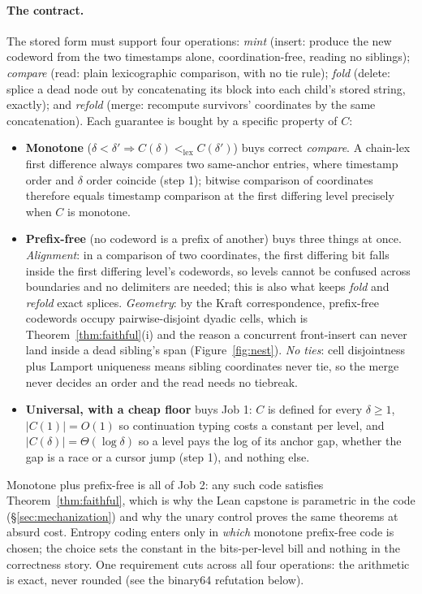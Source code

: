 \documentclass[11pt]{article}
\begin{document}
\paragraph{The contract.} The stored form must support four
operations: \emph{mint} (insert: produce the new codeword from the
two timestamps alone, coordination-free, reading no siblings);
\emph{compare} (read: plain lexicographic comparison, with no tie
rule); \emph{fold} (delete: splice a dead node out by concatenating
its block into each child's stored string, exactly); and
\emph{refold} (merge: recompute survivors' coordinates by the same
concatenation). Each guarantee is bought by a specific property of
$C$:
\begin{itemize}
\item \textbf{Monotone} ($\delta < \delta' \Rightarrow C(\delta)
<_{\mathrm{lex}} C(\delta')$) buys correct \emph{compare}. A
chain-lex first difference always compares two same-anchor entries,
where timestamp order and $\delta$ order coincide (step 1); bitwise
comparison of coordinates therefore equals timestamp comparison at
the first differing level precisely when $C$ is monotone.
\item \textbf{Prefix-free} (no codeword is a prefix of another) buys
three things at once. \emph{Alignment}: in a comparison of two
coordinates, the first differing bit falls inside the first
differing level's codewords, so levels cannot be confused across
boundaries and no delimiters are needed; this is also what keeps
\emph{fold} and \emph{refold} exact splices. \emph{Geometry}: by the
Kraft correspondence, prefix-free codewords occupy pairwise-disjoint
dyadic cells, which is Theorem~\ref{thm:faithful}(i) and the reason
a concurrent front-insert can never land inside a dead sibling's
span (Figure~\ref{fig:nest}). \emph{No ties}: cell disjointness plus
Lamport uniqueness means sibling coordinates never tie, so the merge
never decides an order and the read needs no tiebreak.
\item \textbf{Universal, with a cheap floor} buys Job 1: $C$ is
defined for every $\delta \ge 1$, $|C(1)| = O(1)$ so continuation
typing costs a constant per level, and $|C(\delta)| = \Theta(\log
\delta)$ so a level pays the log of its anchor gap, whether the gap
is a race or a cursor jump (step 1), and nothing else.
\end{itemize}
Monotone plus prefix-free is all of Job 2: any such code satisfies
Theorem~\ref{thm:faithful}, which is why the Lean capstone is
parametric in the code (\S\ref{sec:mechanization}) and why the unary
control proves the same theorems at absurd cost. Entropy coding
enters only in \emph{which} monotone prefix-free code is chosen; the
choice sets the constant in the bits-per-level bill and nothing in
the correctness story. One requirement cuts across all four
operations: the arithmetic is exact, never rounded (see the binary64
refutation below).
\end{document}
